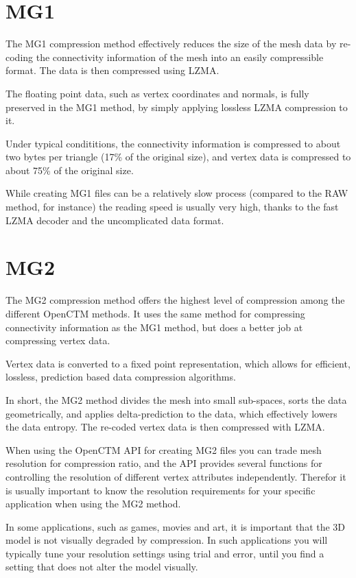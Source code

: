 \section{MG1}
The MG1 compression method effectively reduces the size of the mesh data
by re-coding the connectivity information of the mesh into an easily
compressible format. The data is then compressed using LZMA.

The floating point data, such as vertex coordinates and normals, is fully
preserved in the MG1 method, by simply applying lossless LZMA compression
to it. 

Under typical condititions, the connectivity information is compressed to
about two bytes per triangle (17\% of the original size), and vertex data
is compressed to about 75\% of the original size.

While creating MG1 files can be a relatively slow process (compared to the
RAW method, for instance) the reading speed is usually very high, thanks to
the fast LZMA decoder and the uncomplicated data format.


\section{MG2}
The MG2 compression method offers the highest level of compression among the
different OpenCTM methods. It uses the same method for compressing connectivity
information as the MG1 method, but does a better job at compressing vertex
data.

Vertex data is converted to a fixed point representation, which allows for
efficient, lossless, prediction based data compression algorithms.

In short, the MG2 method divides the mesh into small sub-spaces, sorts the data
geometrically, and applies delta-prediction to the data, which effectively
lowers the data entropy. The re-coded vertex data is then compressed with
LZMA.

When using the OpenCTM API for creating MG2 files you can trade mesh resolution
for compression ratio, and the API provides several functions for controlling
the resolution of different vertex attributes independently. Therefor it is
usually important to know the resolution requirements for your specific
application when using the MG2 method.

In some applications, such as games, movies and art, it is important that the
3D model is not visually degraded by compression. In such applications
you will typically tune your resolution settings using trial and error,
until you find a setting that does not alter the model visually.

